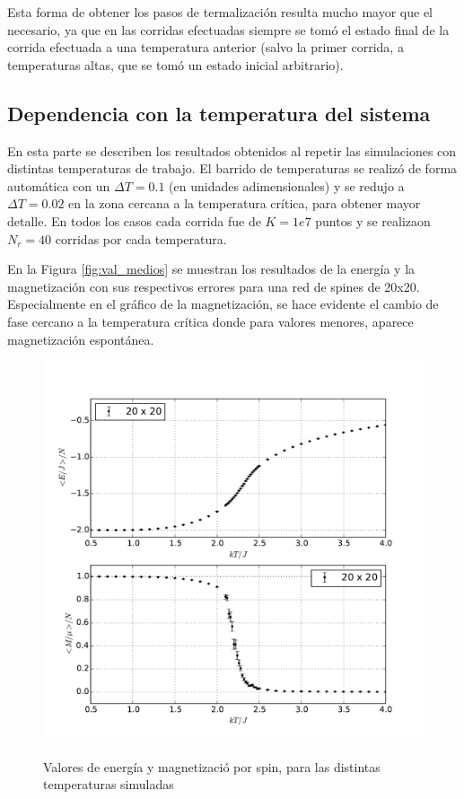 \documentclass[a4paper,12pt]{article}
\begin{document}
Esta forma de obtener los pasos de termalización resulta mucho mayor que el 
necesario, ya que en las corridas efectuadas siempre se tomó el estado final de 
la corrida efectuada a una temperatura anterior (salvo la primer corrida, a 
temperaturas altas, que se tomó un estado inicial arbitrario).

\newpage

\subsection{Dependencia con la temperatura del sistema}

En esta parte se describen los resultados obtenidos al repetir las simulaciones 
con distintas temperaturas de trabajo. El barrido de temperaturas se realizó de 
forma automática con un $\Delta T = 0.1$ (en unidades adimensionales) y se 
redujo a $\Delta T = 0.02$ en la zona cercana a la temperatura crítica, para 
obtener mayor detalle. En todos los casos cada corrida fue de $K=1e7$ puntos y 
se realizaon $N_r=40$ corridas por cada temperatura.

En la Figura \eqref{fig:val_medios} se muestran los resultados de la energía y 
la magnetización con sus respectivos errores para una red de spines de 20x20. 
Especialmente en el gráfico de la magnetización, se hace evidente el cambio de 
fase cercano a la temperatura crítica donde para valores menores, aparece 
magnetización espontánea.

\begin{figure}[H]
    \begin{center}
      \includegraphics[scale=0.7]{val_medios.pdf} \\
      \caption{Valores de energía y magnetizació por spin, para 
      las distintas temperaturas simuladas}\label{fig:val_medios}
    \end{center}
\end{figure}
\end{document}
